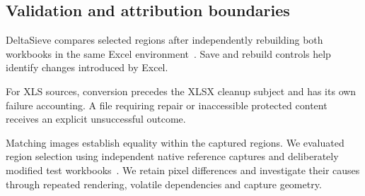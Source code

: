 \subsection{Validation and attribution boundaries}
DeltaSieve compares selected regions after independently rebuilding both
workbooks in the same Excel environment~\cite{deltasievecompanion}. Save and
rebuild controls help identify changes introduced by Excel.

For XLS sources, conversion precedes the XLSX cleanup subject and has its own
failure accounting. A file requiring repair or inaccessible protected content
receives an explicit unsuccessful outcome.

Matching images establish equality within the captured regions. We evaluated
region selection using independent native reference captures and deliberately
modified test workbooks~\cite{layoutcontrols,indirectcontrols}. We retain pixel
differences and investigate their causes through repeated rendering, volatile
dependencies and capture geometry.
